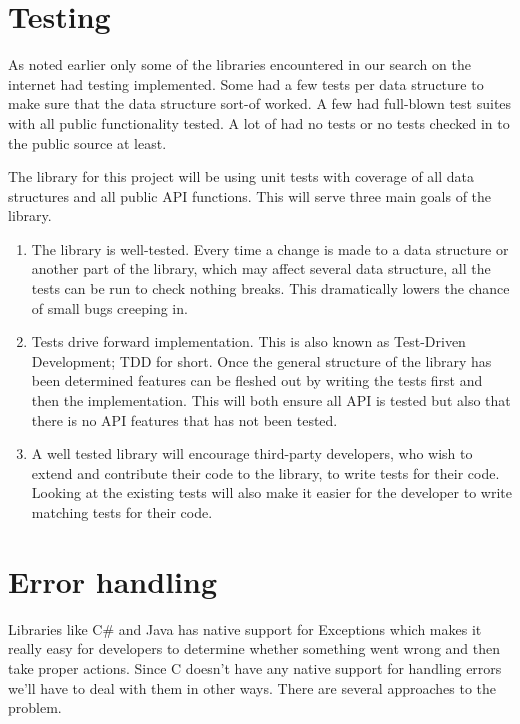 \documentclass[table]{ituthesis}
\begin{document}
\section{Testing}\label{sec:arch_testing}

As noted earlier only some of the libraries encountered in our search on the internet had testing implemented. Some had a few tests per data structure to make sure that the data structure sort-of worked. A few had full-blown test suites with all public functionality tested. A lot of had no tests or no tests checked in to the public source at least.

The library for this project will be using unit tests with coverage of all data structures and all public API functions. This will serve three main goals of the library.

\begin{enumerate}
\item The library is well-tested. Every time a change is made to a data structure or another part of the library, which may affect several data structure, all the tests can be run to check nothing breaks. This dramatically lowers the chance of small bugs creeping in.
\item Tests drive forward implementation. This is also known as Test-Driven Development; TDD for short. Once the general structure of the library has been determined features can be fleshed out by writing the tests first and then the implementation. This will both ensure all API is tested but also that there is no API features that has not been tested.
\item A well tested library will encourage third-party developers, who wish to extend and contribute their code to the library, to write tests for their code. Looking at the existing tests will also make it easier for the developer to write matching tests for their code.
\end{enumerate}

\section{Error handling}\label{sec:arch_error_handling}

Libraries like C\# and Java has native support for Exceptions which makes it really easy for developers to determine whether something went wrong and then take proper actions. Since C doesn't have any native support for handling errors we'll have to deal with them in other ways. There are several approaches to the problem.
\end{document}

